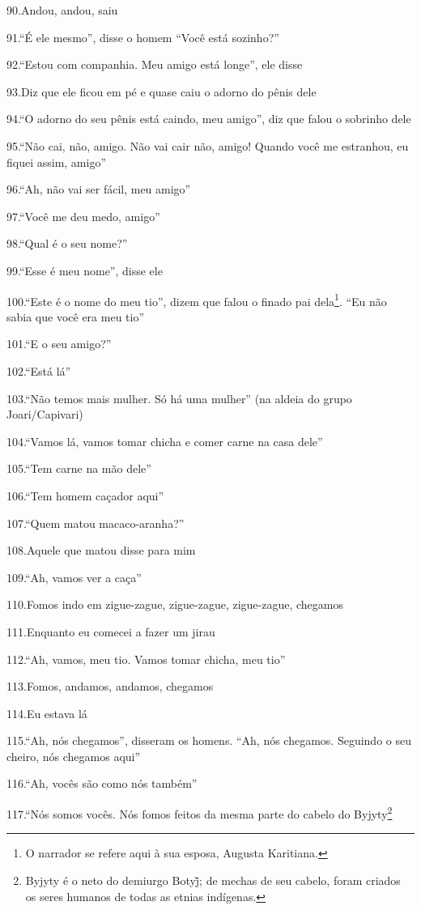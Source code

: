 90.Andou, andou, saiu

91.``É ele mesmo'', disse o homem ``Você está sozinho?''

92.``Estou com companhia. Meu amigo está longe'', ele disse

93.Diz que ele ficou em pé e quase caiu o adorno do pênis dele

94.``O adorno do seu pênis está caindo, meu amigo'', diz que falou o
sobrinho dele

95.``Não cai, não, amigo. Não vai cair não, amigo! Quando você me
estranhou, eu fiquei assim, amigo''

96.``Ah, não vai ser fácil, meu amigo''

97.``Você me deu medo, amigo''

98.``Qual é o seu nome?''

99.``Esse é meu nome'', disse ele

100.``Este é o nome do meu tio'', dizem que falou o finado pai
dela\footnote{O narrador se refere aqui à sua esposa, Augusta Karitiana.}.
``Eu não sabia que você era meu tio''

101.``E o seu amigo?''

102.``Está lá''

103.``Não temos mais mulher. Só há uma mulher'' (na aldeia do grupo
Joari/Capivari)

104.``Vamos lá, vamos tomar chicha e comer carne na casa dele''

105.``Tem carne na mão dele''

106.``Tem homem caçador aqui''

107.``Quem matou macaco-aranha?''

108.Aquele que matou disse para mim

109.``Ah, vamos ver a caça''

110.Fomos indo em zigue-zague, zigue-zague, zigue-zague, chegamos

111.Enquanto eu comecei a fazer um jirau

112.``Ah, vamos, meu tio. Vamos tomar chicha, meu tio''

113.Fomos, andamos, andamos, chegamos

114.Eu estava lá

115.``Ah, nós chegamos'', disseram os homens. ``Ah, nós chegamos.
Seguindo o seu cheiro, nós chegamos aqui''

116.``Ah, vocês são como nós também''

117.``Nós somos vocês. Nós fomos feitos da mesma parte do cabelo do
Byjyty\footnote{Byjyty é o neto do demiurgo Botyj̃; de mechas de seu
  cabelo, foram criados os seres humanos de todas as etnias indígenas.}

